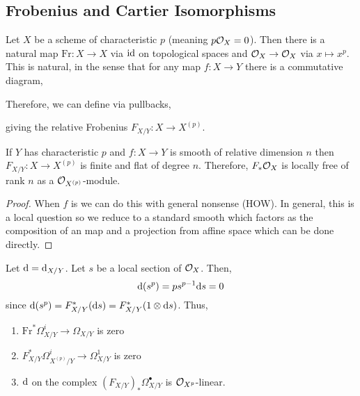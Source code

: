 \documentclass[12pt]{article}
\begin{document}
\subsection{Frobenius and Cartier Isomorphisms}

\newcommand{\Fr}{\mathrm{Fr}}

\begin{defn}
Let $X$ be a scheme of characteristic $p$ (meaning $p \mathcal{O}_{X} = 0$). Then there is a natural map $\Fr : X \to X$ via $\mathrm{id}$ on topological spaces and $\mathcal{O}_{X} \to \mathcal{O}_{X}$ via $x \mapsto x^p$. This is natural, in the sense that for any map $f : X \to Y$ there is a commutative diagram,
\begin{center}
\end{center}
Therefore, we can define via pullbacks,
\begin{center}
\end{center}
giving the relative Frobenius $F_{X/Y} : X \to X^{(p)}$. 
\end{defn}

\begin{prop}
If $Y$ has characteristic $p$ and $f : X \to Y$ is smooth of relative dimension $n$ then $F_{X/Y} : X \to X^{(p)}$ is finite and flat of degree $n$. Therefore, $F_* \mathcal{O}_{X}$ is locally free of rank $n$ as a $\mathcal{O}_{X^{(p)}}$-module.
\end{prop}

\begin{proof}
When $f$ is \etale we can do this with general nonsense (HOW). In general, this is a local question so we reduce to a standard smooth which factors as the composition of an \etale map and a projection from affine space which can be done directly.
\end{proof}

\begin{prop}
Let $\mathrm{d} = \mathrm{d}_{X/Y}$. Let $s$ be a local section of $\mathcal{O}_{X}$. Then,
\[ \mathrm{d}{(s^p)} = p s^{p-1} \mathrm{d}{s} = 0 \]
since $\mathrm{d}{(s^p)} = F_{X/Y}^*(\mathrm{d}{s}) = F^*_{X/Y}(1 \otimes \mathrm{d}{s})$. Thus,
\begin{enumerate}
\item $\Fr^* \Omega^i_{X/Y} \to \Omega_{X/Y}$ is zero
\item $F^*_{X/Y} \Omega^i_{X^{(p)}/Y} \to \Omega^1_{X/Y}$ is zero
\item $\mathrm{d}$ on the complex $(F_{X/Y})_* \Omega^\bullet_{X/Y}$ is $\mathcal{O}_{X^p}$-linear.
\end{enumerate}
\end{prop}
\end{document}
